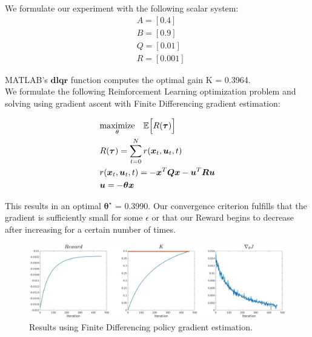 \documentclass[11pt]{homework}
\renewcommand{\vec}[1]{\ensuremath{\boldsymbol{#1}}}
\begin{document}
\maketitle

\renewcommand{\questiontype}{Problem}
\question

	We formulate our experiment with the following scalar system:
	\begin{align*}
		& A=[0.4] \\
		& B=[0.9] \\
		& Q=[0.01] \\
		& R=[0.001]
	\end{align*}

	MATLAB's \vec{dlqr} function computes the optimal gain K = 0.3964. \\

	We formulate the following Reinforcement Learning optimization problem and solving using gradient ascent with Finite Differencing gradient estimation: 
	
	\begin{align*}
		& \underset{\theta}{\text{maximize}} \hspace{0.35cm} \mathbb{E}\Big[R(\vec{\tau}) \Big] \\
		& R(\vec{\tau}) = \sum_{t=0}^{N} r(\vec{x}_{t},\vec{u}_{t},t) \\
		& r(\vec{x}_{t},\vec{u}_{t},t) = -\vec{x}^T \vec{Q}\vec{x} - \vec{u}^{T}\vec{R}\vec{u} \\
		& \vec{u} = -\vec{\theta}\vec{x}
	\end{align*}
	
	This results in an optimal $\vec{\theta}^{\star}$ = 0.3990. Our convergence criterion fulfills that the gradient is sufficiently small for some $\epsilon$ or that our Reward begins to decrease after increasing for a certain number of times.  
	
	\begin{figure}[H]
		\centering
		\includegraphics[scale=0.23]{finite_differencing_results}
		\caption{Results using Finite Differencing policy gradient estimation.}
		\label{}
	\end{figure}
\end{document}

